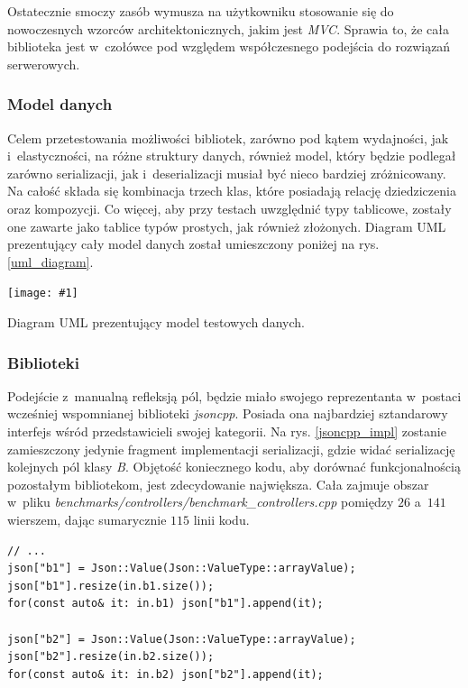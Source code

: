 \documentclass[12pt]{article}
\newcommand{\n}{\newline}
\newcommand{\putfig}[3]{
\begin{captioned}[H]
	\centering
	\texttt{[image: \#1]}
	\caption{#2}
	\label{#3}
	\medskip
\end{captioned}
}
\newcommand{\nonpl}[1]{{\it #1}}
\newcommand{\code}[1]{{\it #1}}
\begin{document}
{{{				Ostatecznie smoczy zasób wymusza na użytkowniku stosowanie się do nowoczesnych wzorców architektonicznych, jakim jest \nonpl{MVC}\cite{mvc}.
				Sprawia to, że cała biblioteka jest w~czołówce pod względem współczesnego podejścia do rozwiązań serwerowych.
			}

			{
				\subsubsection{Model danych}

				Celem przetestowania możliwości bibliotek, zarówno pod kątem wydajności, jak i~elastyczności, na różne struktury danych,
				również model, który będzie podlegał zarówno serializacji, jak i~deserializacji musiał być nieco bardziej zróżnicowany.
				Na całość składa się kombinacja trzech klas, które posiadają relację dziedziczenia oraz kompozycji. Co więcej, aby przy
				testach uwzględnić typy tablicowe, zostały one zawarte jako tablice typów prostych, jak również złożonych. Diagram UML prezentujący
				cały model danych został umieszczony poniżej na rys. \ref{uml_diagram}.

				\putfig{./img/benchmark_model_uml_diagram.png}{Diagram UML prezentujący model testowych danych.}{uml_diagram}
			}

			{
				\subsubsection{Biblioteki}

				Podejście z~manualną refleksją pól, będzie miało swojego reprezentanta w~postaci wcześniej wspomnianej biblioteki \nonpl{jsoncpp}.
				Posiada ona najbardziej sztandarowy interfejs wśród przedstawicieli swojej kategorii. Na rys. \ref{jsoncpp_impl} zostanie zamieszczony jedynie fragment
				implementacji serializacji, gdzie widać serializację kolejnych pól klasy \code{B}. Objętość koniecznego kodu, aby dorównać funkcjonalnością pozostałym bibliotekom,
				jest zdecydowanie największa. Cała zajmuje obszar w~pliku \nonpl{benchmarks/controllers/benchmark\_controllers.cpp} pomiędzy $26$ a~$141$ wierszem,
				dając sumarycznie $115$ linii kodu.\n

				\begin{captioned}[H]
					\begin{lstlisting}[frame=single]
// ...
json["b1"] = Json::Value(Json::ValueType::arrayValue);
json["b1"].resize(in.b1.size());
for(const auto& it: in.b1) json["b1"].append(it);

json["b2"] = Json::Value(Json::ValueType::arrayValue);
json["b2"].resize(in.b2.size());
for(const auto& it: in.b2) json["b2"].append(it);


\end{lstlisting}
\end{captioned}}}}
\end{document}
